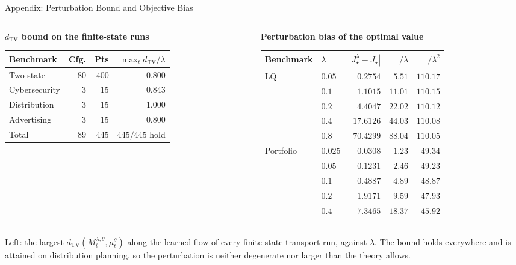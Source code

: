 \documentclass[9pt]{beamer}
\newcommand{\TV}{d_{\mathrm{TV}}}
\newcommand{\exhibittitle}[1]{%
  \begin{center}{\small\bfseries\color{Xblue}#1}\end{center}%
  \vspace{-0.28cm}}
\newenvironment{exhibit}[1]{%
  \exhibittitle{#1}%
  \par\vspace{0.05cm}\begin{center}}%
  {\end{center}\vspace{-0.15cm}}
\begin{document}
\begin{frame}{Appendix: Perturbation Bound and Objective Bias}
\scriptsize
\begin{columns}[T]
\begin{column}{0.47\textwidth}
\begin{exhibit}{$\TV$ bound on the finite-state runs}
\begin{tabular}{lrrr}
\toprule
Benchmark & Cfg. & Pts & $\max_t\TV/\lambda$ \\
\midrule
Two-state & 80 & 400 & $0.800$ \\
Cybersecurity & 3 & 15 & $0.843$ \\
Distribution & 3 & 15 & $1.000$ \\
Advertising & 3 & 15 & $0.800$ \\
\midrule
Total & $89$ & $445$ & $445/445$ hold \\
\bottomrule
\end{tabular}
\end{exhibit}
\end{column}
\begin{column}{0.51\textwidth}
\begin{exhibit}{Perturbation bias of the optimal value}
\begin{tabular}{llrrr}
\toprule
Benchmark & $\lambda$ & $|J^\lambda_\star-J_\star|$ & $/\lambda$ & $/\lambda^2$ \\
\midrule
LQ & $0.05$ & $0.2754$ & $5.51$ & $110.17$ \\
 & $0.1$ & $1.1015$ & $11.01$ & $110.15$ \\
 & $0.2$ & $4.4047$ & $22.02$ & $110.12$ \\
 & $0.4$ & $17.6126$ & $44.03$ & $110.08$ \\
 & $0.8$ & $70.4299$ & $88.04$ & $110.05$ \\
\midrule
Portfolio & $0.025$ & $0.0308$ & $1.23$ & $49.34$ \\
 & $0.05$ & $0.1231$ & $2.46$ & $49.23$ \\
 & $0.1$ & $0.4887$ & $4.89$ & $48.87$ \\
 & $0.2$ & $1.9171$ & $9.59$ & $47.93$ \\
 & $0.4$ & $7.3465$ & $18.37$ & $45.92$ \\
\bottomrule
\end{tabular}
\end{exhibit}
\end{column}
\end{columns}

\vspace{0.15cm}
\small
Left: the largest $\TV(M_t^{\lambda,\theta},\mu_t^\theta)$ along the learned flow of every finite-state transport run, against $\lambda$. The bound holds everywhere and is attained on distribution planning, so the perturbation is neither degenerate nor larger than the theory allows.


\end{frame}
\end{document}
